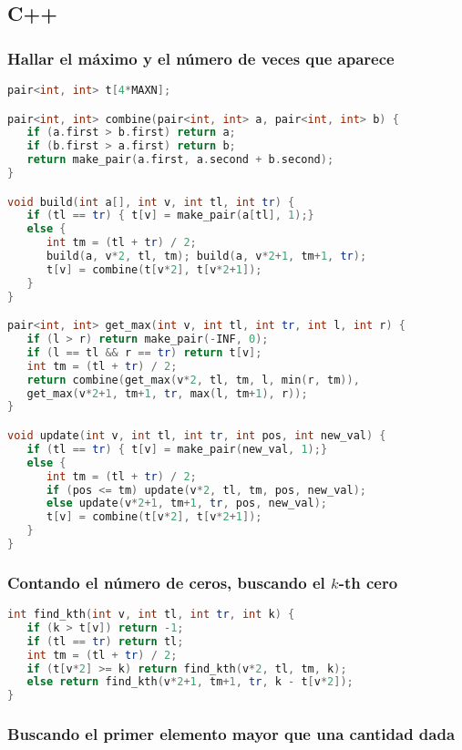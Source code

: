 \subsection{C++}

\subsubsection{Hallar el máximo y el número de veces que aparece}

\begin{lstlisting}[language=C++]
pair<int, int> t[4*MAXN];

pair<int, int> combine(pair<int, int> a, pair<int, int> b) {
   if (a.first > b.first) return a;
   if (b.first > a.first) return b;
   return make_pair(a.first, a.second + b.second);
}

void build(int a[], int v, int tl, int tr) {
   if (tl == tr) { t[v] = make_pair(a[tl], 1);} 
   else {
      int tm = (tl + tr) / 2;
      build(a, v*2, tl, tm); build(a, v*2+1, tm+1, tr);
      t[v] = combine(t[v*2], t[v*2+1]);
   }
}

pair<int, int> get_max(int v, int tl, int tr, int l, int r) {
   if (l > r) return make_pair(-INF, 0);
   if (l == tl && r == tr) return t[v];
   int tm = (tl + tr) / 2;
   return combine(get_max(v*2, tl, tm, l, min(r, tm)), 
   get_max(v*2+1, tm+1, tr, max(l, tm+1), r));
}

void update(int v, int tl, int tr, int pos, int new_val) {
   if (tl == tr) { t[v] = make_pair(new_val, 1);} 
   else {
      int tm = (tl + tr) / 2;
      if (pos <= tm) update(v*2, tl, tm, pos, new_val);
      else update(v*2+1, tm+1, tr, pos, new_val);
      t[v] = combine(t[v*2], t[v*2+1]);
   }
}
\end{lstlisting}

\subsubsection{Contando el número de ceros, buscando el $k$-th cero}
\begin{lstlisting}[language=C++]
int find_kth(int v, int tl, int tr, int k) {
   if (k > t[v]) return -1;
   if (tl == tr) return tl;
   int tm = (tl + tr) / 2; 
   if (t[v*2] >= k) return find_kth(v*2, tl, tm, k);
   else return find_kth(v*2+1, tm+1, tr, k - t[v*2]);
}
\end{lstlisting}

\subsubsection{Buscando el primer elemento mayor que una cantidad dada}

